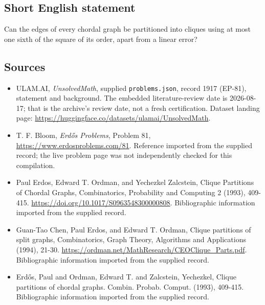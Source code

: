 \documentclass[11pt,a4paper]{article}
\begin{document}
\subsection{Short English statement}

Can the edges of every chordal graph be partitioned into cliques using at most one sixth of the square of its order, apart from a linear error?

\subsection{Sources}

{\small

\begin{itemize}

\item[\hypertarget{source:1917:1}{S1}] ULAM.AI, \emph{UnsolvedMath}, supplied \texttt{problems.json}, record 1917 (EP-81), statement and background. The embedded literature-review date is 2026-08-17; that is the archive’s review date, not a fresh certification. Dataset landing page: \url{https://huggingface.co/datasets/ulamai/UnsolvedMath}.

\item[\hypertarget{source:1917:2}{S2}] T. F. Bloom, \emph{Erdős Problems}, Problem 81, \url{https://www.erdosproblems.com/81}. Reference imported from the supplied record; the live problem page was not independently checked for this compilation.

\item[\hypertarget{source:1917:3}{S3}] Paul Erdos, Edward T. Ordman, and Yechezkel Zalcstein, Clique Partitions of Chordal Graphs, Combinatorics, Probability and Computing 2 (1993), 409-415. \url{https://doi.org/10.1017/S0963548300000808}. Bibliographic information imported from the supplied record.

\item[\hypertarget{source:1917:4}{S4}] Guan-Tao Chen, Paul Erdos, and Edward T. Ordman, Clique partitions of split graphs, Combinatorics, Graph Theory, Algorithms and Applications (1994), 21-30. \url{https://ordman.net/MathResearch/CEOClique_Parts.pdf}. Bibliographic information imported from the supplied record.

\item[\hypertarget{source:1917:5}{S5}] Erd\H{o}s, Paul and Ordman, Edward T. and Zalcstein, Yechezkel, Clique partitions of chordal graphs. Combin. Probab. Comput. (1993), 409-415. Bibliographic information imported from the supplied record.

\end{itemize}

}

\label{end:1917}
\end{document}
